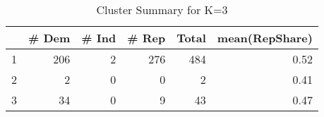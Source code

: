 \begin{table}[ht]
\centering
\begin{tabular}{rrrrrr}
  \hline
 & \# Dem & \# Ind & \# Rep & Total & mean(RepShare) \\ 
  \hline
1 & 206 &   2 & 276 & 484 & 0.52 \\ 
  2 &   2 &   0 &   0 &   2 & 0.41 \\ 
  3 &  34 &   0 &   9 &  43 & 0.47 \\ 
   \hline
\end{tabular}
\caption{Cluster Summary for K=3} 
\label{tab:k_means_3}
\end{table}
